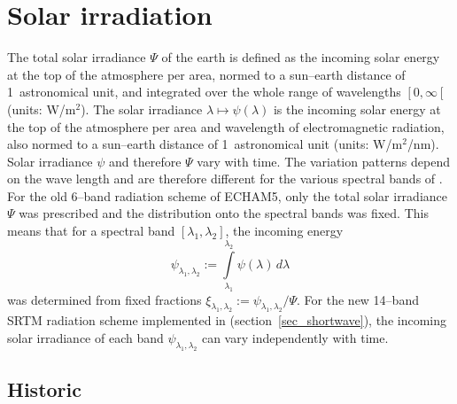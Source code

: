 \section{Solar irradiation\label{sec:externaldata_solar}}

The total solar irradiance $\Psi$ of the earth is defined as the incoming
solar energy at the top of the atmosphere per area, normed to a
sun--earth distance of 1~astronomical unit, and integrated over the
whole range of wavelengths $\left[0,\infty\left[\right.\right.$
(units: W/m$^2$).
The solar irradiance $\lambda\mapsto\psi(\lambda)$ is the incoming
solar energy at the top of the 
atmosphere per area and wavelength of electromagnetic radiation, also
normed to a sun--earth distance of 1~astronomical unit (units: W/m$^2$/nm). 
Solar irradiance $\psi$ and therefore $\Psi$ vary with time. The
variation patterns depend on 
the wave length and are therefore different for the various spectral
bands of \echam. For the old 6--band radiation scheme of ECHAM5, only the total
solar irradiance $\Psi$ was prescribed and the distribution onto the spectral
bands was fixed. This means that for a spectral band
$[\lambda_1,\lambda_2]$, the incoming energy
\begin{displaymath}
\psi_{\lambda_1,\lambda_2}:=\int\limits_{\lambda_1}^{\lambda_2}\psi(\lambda)\,d\lambda 
\end{displaymath} 
was determined from fixed fractions
$\xi_{\lambda_1,\lambda_2}:=\psi_{\lambda_1,\lambda_2}/\Psi$. For the
new 14--band SRTM 
radiation scheme implemented in \echam{} (section~\ref{sec_shortwave}),
the incoming solar irradiance of each band 
$\psi_{\lambda_1,\lambda_2}$ can vary independently with time.



\subsection{Historic}

